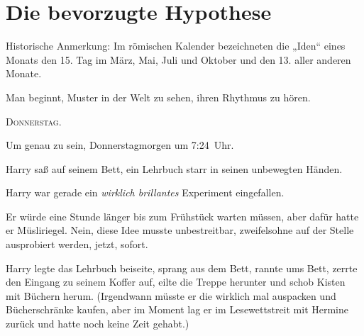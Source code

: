 \chapter{Die bevorzugte Hypothese}

\begin{chapterOpeningAuthorNote}
% 
Historische Anmerkung: Im römischen Kalender bezeichneten die „Iden“ eines Monats den 15. Tag im März, Mai, Juli und Oktober und den 13. aller anderen Monate.
\end{chapterOpeningAuthorNote}
\begin{chapterOpeningQuote}
Man beginnt, Muster in der Welt zu sehen, ihren Rhythmus zu hören.
\end{chapterOpeningQuote}

\lettrine{D}{onnerstag}.

\hplettrineextrapara
Um genau zu sein, Donnerstagmorgen um 7:24~Uhr.

Harry saß auf seinem Bett, ein Lehrbuch starr in seinen unbewegten Händen.

Harry war gerade ein \emph{wirklich brillantes} Experiment eingefallen.

Er würde eine Stunde länger bis zum Frühstück warten müssen, aber dafür hatte er Müsliriegel. Nein, diese Idee musste unbestreitbar, zweifelsohne auf der Stelle ausprobiert werden, jetzt, sofort.

Harry legte das Lehrbuch beiseite, sprang aus dem Bett, rannte ums Bett, zerrte den Eingang zu seinem Koffer auf, eilte die Treppe herunter und schob Kisten mit Büchern herum. (Irgendwann müsste er die wirklich mal auspacken und Bücherschränke kaufen, aber im Moment lag er im Lesewettstreit mit Hermine zurück und hatte noch keine Zeit gehabt.)

